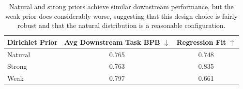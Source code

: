 \begin{table}[t]
\centering
\caption{Natural and strong priors achieve similar downstream performance, but the weak prior does considerably worse, suggesting that this design choice is fairly robust and that the natural distribution is a reasonable configuration.}
\begin{tabular}{lcc}
\toprule
Dirichlet Prior & Avg Downstream Task BPB $\downarrow$ & Regression Fit $\uparrow$ \\
\midrule
Natural & 0.765 & 0.748 \\
Strong  & 0.763 & 0.835 \\
Weak    & 0.797 & 0.661 \\
\bottomrule
\end{tabular}
\label{tab:dirichlet_priors}
\end{table}
